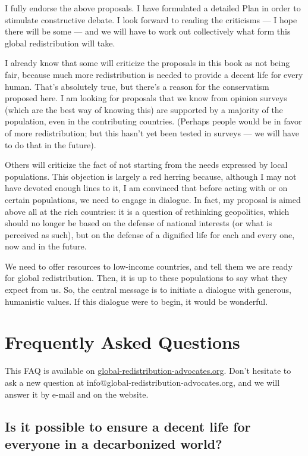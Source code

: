 \documentclass[a5paper,english,openany]{memoir}
\begin{document}
I fully endorse the above proposals. I have formulated a detailed Plan in order to stimulate constructive debate. I look forward to reading the criticisms --- I hope there will be some --- and we will have to work out collectively what form this global redistribution will take. 

I already know that some will criticize the proposals in this book as not being fair, because much more redistribution is needed to provide a decent life %
for every human. That's absolutely true, but there's a reason for the conservatism proposed here. 
I am looking for proposals that we know from opinion surveys (which are the best way of knowing this) are supported by a majority of the population, even in the contributing countries. (Perhaps people would be in favor of more redistribution; but this hasn't yet been tested in surveys --- we will have to do that in the future). %

Others will criticize the fact of not starting from the needs expressed by local populations. 
This objection is largely a red herring because, although I may not have devoted enough lines to it, I am convinced that before acting with or on certain populations, we need to engage in dialogue. In fact, my proposal is aimed above all at the rich countries: it is a question of rethinking geopolitics, which should no longer be based on the defense of national interests (or what is perceived as such), but on the defense of a dignified life for each and every one, now and in the future. 

We need to offer resources to low-income countries, and tell them we are ready for global redistribution. Then, it is up to these populations to say what they expect from us. 
So, the central message is to initiate a dialogue with generous, humanistic values. If this dialogue were to begin, it would be wonderful. 

\chapter*{Frequently Asked Questions}\label{ch:faq}

This FAQ is available on \href{http://global-redistribution-advocates.org/}{global-redistribution-advocates.org}. Don't hesitate to ask a new question at info@global-redistribution-advocates.org, and we will answer it by e-mail and on the website.

\section*{\normalsize Is it possible to ensure a decent life for everyone in a decarbonized world?}\label{q:decent}
\end{document}
